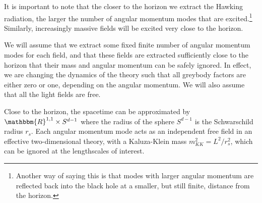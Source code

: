 \documentclass[12pt]{article}
\begin{document}
It is important to note that the closer to the horizon we extract the Hawking radiation, the larger the number of angular momentum modes that are excited.\footnote{Another way of saying this is that modes with larger angular momentum are reflected back into the black hole at a smaller, but still finite, distance from the horizon.} Similarly, increasingly massive fields will be excited very close to the horizon. 

We will assume that we extract some fixed finite number of angular momentum modes for each field, and that these fields are extracted sufficiently close to the horizon that their mass and angular momentum can be safely ignored. In effect, we are changing the dynamics of the theory such that all greybody factors are either zero or one, depending on the angular momentum. We will also assume that all the light fields are free.

Close to the horizon, the spacetime can be approximated by $\mathbbm{R}^{1,1} \times S^{d-1}$ where the radius of the sphere $S^{d-1}$ is the Schwarschild radius $r_s$. Each angular momentum mode acts as an independent free field in an effective two-dimensional theory, with a Kaluza-Klein mass $m_{KK}^2 = L^2 / r_s^2$, which can be ignored at the lengthscales of interest.
\end{document}
